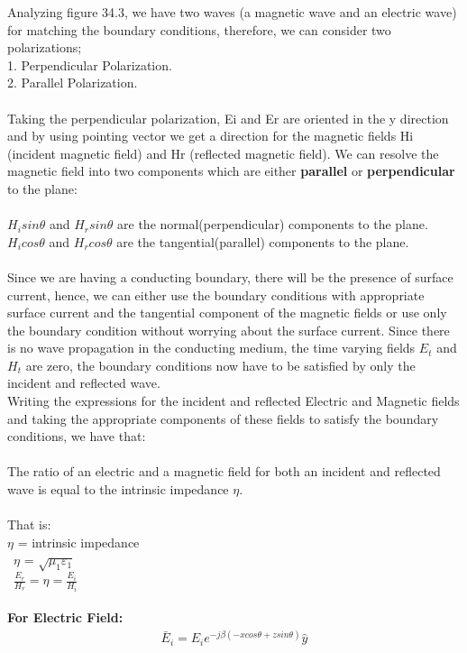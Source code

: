  Analyzing figure 34.3, we have two waves (a magnetic wave and an electric wave) for matching the boundary conditions, therefore, we can consider two polarizations;\\ 1. Perpendicular Polarization. \\ 2. Parallel Polarization. \\\\ Taking the perpendicular polarization, Ei and Er are oriented in the y
direction and by using pointing vector we get a direction for the magnetic fields Hi (incident magnetic field) and Hr (reflected magnetic field). We can resolve the magnetic field into two
components which are either \textbf{parallel} or \textbf{perpendicular} to the plane:
\\\\ $ H_isin\theta $ and $ H_rsin\theta $  are the normal(perpendicular) components to the plane. \\
$ H_icos\theta $ and $ H_rcos\theta $ are the tangential(parallel) components to the plane. \\\\
Since we are having a conducting boundary, there will be the presence of surface current, hence, we can either use the boundary conditions with appropriate surface current and the tangential component of the magnetic fields or use only the boundary condition without worrying about the surface current. Since there is no wave propagation in the conducting medium, the time varying fields $E_t$ and $H_t$ are zero, the boundary conditions now have to be satisfied by only the incident and reflected wave.
\\ Writing the expressions for the incident and reflected Electric and
Magnetic fields and taking the appropriate components of these fields
to satisfy the boundary conditions, we have that:
\\\\ The ratio of an electric and a magnetic field for both an incident and reflected wave is equal to the intrinsic impedance $\eta $.
\\\\ That is:
\\ $ \eta $ = intrinsic impedance
\\
\ $ \eta $ = $\sqrt{\mu_1 \varepsilon_1 }$
\\\ $\frac{E_r}{H_r} = \eta = \frac{E_i}{H_i}$
\\\\ \textbf{For Electric Field:}
\begin{align}
\bar{E}_i = E_i e^{-j\beta(-xcos\theta + zsin\theta)} \hat{y}  \end{align} 
